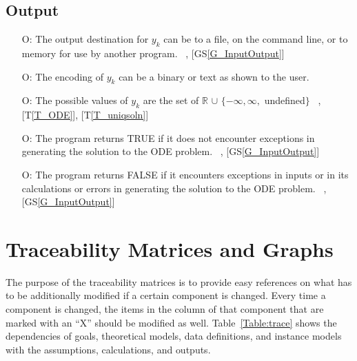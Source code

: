 \documentclass[12pt]{article}
\newcommand{\tref}[1]{T\ref{#1}}
\newcommand{\gsref}[1]{GS\ref{#1}}
\newcounter{outputnum} %
\begin{document}
\subsection{Output} \label{sec_Output}

\begin{itemize}
\item[O\refstepcounter{outputnum}\theoutputnum \label{O_outputyk}:]
The output destination for $y_k$ can be to a file, on the command line, or to memory for use by
another program.
~\newline
[\gsref{G_SolveForY}], [\gsref{G_InputOutput}]


\item[O\refstepcounter{outputnum}\theoutputnum \label{O_encodingyk}:]
The encoding of $y_k$ can be a binary or text as shown to the user.
~\newline
[\gsref{G_InputOutput}]

\item[O\refstepcounter{outputnum}\theoutputnum \label{O_valuesyk}:]
The possible values of $y_k$ are the set of $\mathbb{R}$
$\cup$ $\{-\infty, \infty,$ undefined$\}$
~\newline
[\gsref{G_SolveForY}], [\tref{T_ODE}], [\tref{T_uniqsoln}]

\item[O\refstepcounter{outputnum}\theoutputnum \label{O_success}:]
The program returns TRUE if it does not encounter exceptions in generating the solution
to the ODE problem.
~\newline
[\gsref{G_SolveForY}], [\gsref{G_InputOutput}]

\item[O\refstepcounter{outputnum}\theoutputnum \label{O_fail}:]
The program returns FALSE if it encounters exceptions in inputs or in its calculations
or errors in generating the solution to the ODE problem.
~\newline
[\gsref{G_SolveForY}], [\gsref{G_InputOutput}]

\end{itemize}

\newpage

\section{Traceability Matrices and Graphs}

The purpose of the traceability matrices is to provide easy references on what has to be additionally modified if a certain component is changed.  Every time a 
component is changed, the items in the column of that component that are 
marked with an ``X'' should be modified as well.  Table~\ref{Table:trace}
shows the dependencies of goals, theoretical models, data
definitions, and instance models with the assumptions, calculations, and outputs.
\end{document}
